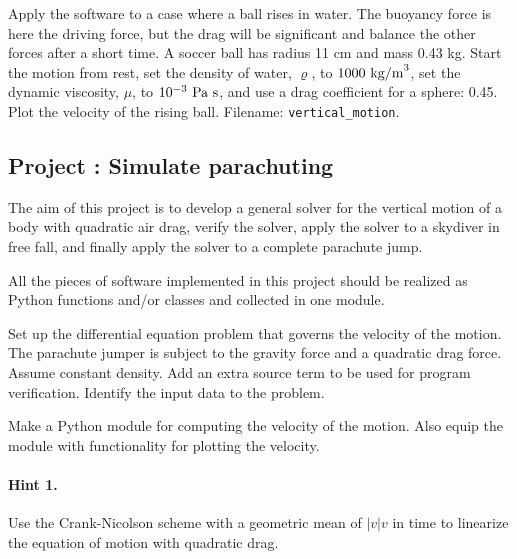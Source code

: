 \documentclass[graybox,sectrefs,envcountresetchap,open=right,final]{svmonodo}
\newenvironment{doconceexercise}{}{}
\newcounter{doconceexercisecounter}
\begin{document}
\begin{doconceexercise}
Apply the software to a case where a ball rises in water.  The
buoyancy force is here the driving force, but the drag will be
significant and balance the other forces after a short time.  A soccer
ball has radius 11 cm and mass 0.43 kg.  Start the motion from rest, set
the density of water, $\varrho$, to $1000\hbox{ kg/m}^3$, set the
dynamic viscosity, $\mu$, to $10^{-3}\hbox{ Pa s}$, and use a drag
coefficient for a sphere: 0.45. Plot the velocity of the rising ball.
\noindent Filename: \Verb!vertical_motion!.

\end{doconceexercise}




\begin{doconceexercise}

\subsection*{Project \thedoconceexercisecounter: Simulate parachuting}

\label{decay:app:exer:parachute}

The aim of this project is to develop a general solver for the
vertical motion of a body with quadratic air drag, verify the solver,
apply the solver to a skydiver in free fall, and finally apply the
solver to a complete parachute jump.

All the pieces of software implemented in this project should be
realized as Python functions and/or classes and collected in one
module.


Set up the differential equation problem that governs the velocity
of the motion.
The parachute jumper is subject to the gravity force and a quadratic
drag force. Assume constant density.
Add an extra source term to be used for program verification.
Identify the input data to the problem.

Make a Python module for computing the velocity of the motion.
Also equip the module with functionality for plotting the velocity.


\paragraph{Hint 1.}
Use the Crank-Nicolson scheme with a geometric mean of $|v|v$ in time to
linearize the equation of motion with quadratic drag.


\end{doconceexercise}
\end{document}
